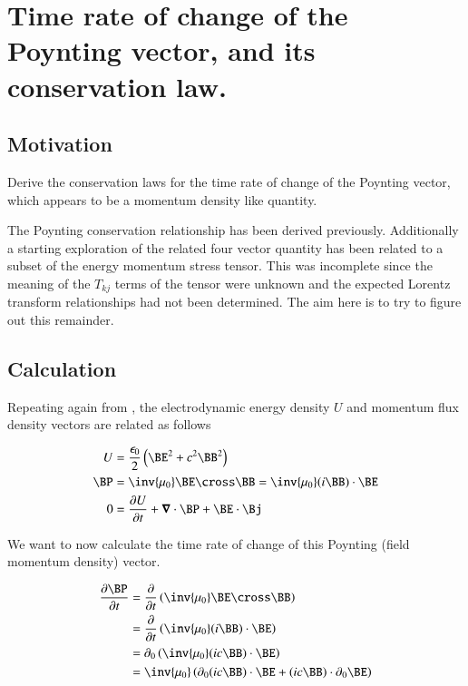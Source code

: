 \chapter{Time rate of change of the Poynting vector, and its conservation law.}\label{chap:PJpoyntingRate}
\date{Jan 18, 2009.  poyntingRate.tex}

\section{Motivation }

Derive the conservation laws for the time rate of change of the Poynting vector, which appears to be a momentum density like quantity.

The Poynting conservation relationship has been derived previously.  Additionally a starting
exploration
of the related four vector quantity has been related to a subset of the energy momentum stress tensor.
This was incomplete since the meaning of the $T_{kj}$ terms of the tensor were unknown and the expected
Lorentz transform relationships had not been determined.  The aim here is to try to figure out this remainder.

\section{Calculation }

Repeating again from , the electrodynamic energy density $U$ and momentum flux density vectors are related as follows

\begin{align}\label{eqn:poynting_rate:fromPoyntingNotes}
U &= \frac{\epsilon_0}{2}\left( \BE^2 + c^2 \BB^2 \right) \\
\BP &= \inv{\mu_0}\BE \cross \BB = \inv{\mu_0} (i \BB) \cdot \BE \\
0 &= \PD{t}{U} + \spacegrad \cdot \BP + \BE \cdot \Bj
\end{align}

We want to now calculate the time rate of change of this Poynting (field momentum density) vector.

\begin{align*}
\PD{t}{\BP}
&= \PD{t}{} \left( \inv{\mu_0} \BE \cross \BB \right) \\
&= \PD{t}{} \left( \inv{\mu_0}(i\BB) \cdot \BE \right) \\
&= \partial_0 \left( \inv{\mu_0}(i c\BB) \cdot \BE \right) \\
&= \inv{\mu_0} \left( \partial_0 (i c\BB) \cdot \BE  + (i c\BB) \cdot \partial_0 \BE  \right)
\end{align*}

